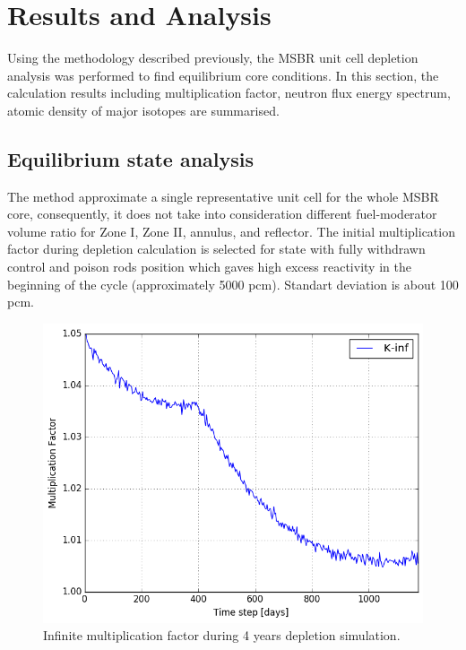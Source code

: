 \documentclass{anstrans}
\begin{document}
\section{Results and Analysis}

Using the methodology described previously, the \gls{MSBR} unit cell depletion analysis was performed to find equilibrium core conditions. In this section, the calculation results including multiplication factor, neutron flux energy spectrum, atomic density of major isotopes are summarised.

\subsection{Equilibrium state analysis}

The method approximate a single representative unit cell for the whole \gls{MSBR} core, consequently, it does not take into consideration different fuel-moderator volume ratio for Zone I, Zone II, annulus, and reflector. The initial multiplication factor during depletion calculation is selected for state with fully withdrawn control and poison rods position which gaves high excess reactivity in the beginning of the cycle (approximately 5000 pcm). Standart deviation is about 100 pcm.

\begin{figure}[hb] %
  \centering
  \vspace{-0.8em}
  \includegraphics[width=1.03\linewidth]{keff.png}
  \caption{Infinite multiplication factor during 4 years depletion simulation.}
    \vspace{-0.8em}
  \label{fig:keff}
\end{figure}
\end{document}
